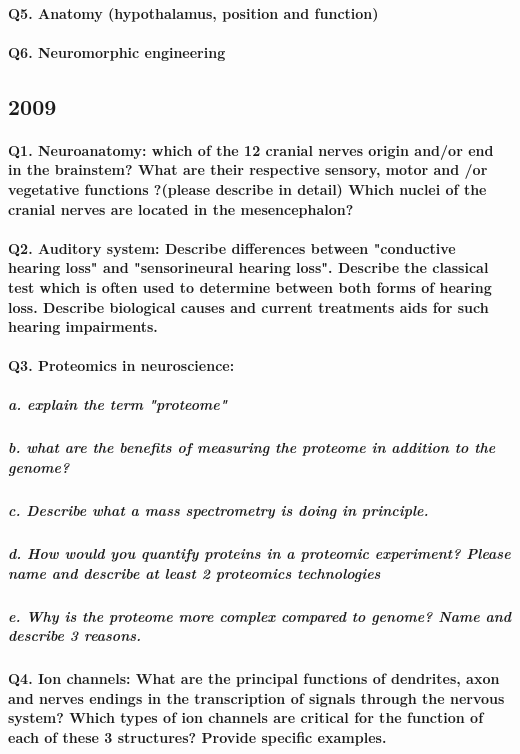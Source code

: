 \documentclass[12pt,article,oneside,a4paper]{memoir}
\begin{document}
\paragraph{Q5. Anatomy (hypothalamus, position and function)}
\paragraph{Q6. Neuromorphic engineering}

\subsection{2009}
\paragraph{Q1. Neuroanatomy: which of the 12 cranial nerves origin and/or end in the brainstem? What are their respective sensory, motor and /or vegetative functions ?(please describe in detail) Which nuclei of the cranial nerves are located in the mesencephalon?}
\paragraph{Q2. Auditory system: Describe differences between "conductive hearing loss" and "sensorineural hearing loss". Describe the classical test which is often used to determine between both forms of hearing loss. Describe biological causes and current treatments aids for such hearing impairments.}

\paragraph{Q3. Proteomics in neuroscience:}
\subparagraph{a. explain the term "proteome"}
\subparagraph{b. what are the benefits of measuring the proteome in addition to the genome?}
\subparagraph{c. Describe what a mass spectrometry is doing in principle.}
\subparagraph{d. How would you quantify proteins in a proteomic experiment? Please name and describe at least 2 proteomics technologies}
\subparagraph{e. Why is the proteome more complex compared to genome? Name and describe 3 reasons.}
\paragraph{Q4. Ion channels: What are the principal functions of dendrites, axon and nerves endings in the transcription of signals through the nervous system? Which types of ion channels are critical for the function of each of these 3 structures? Provide specific examples.}
\end{document}
